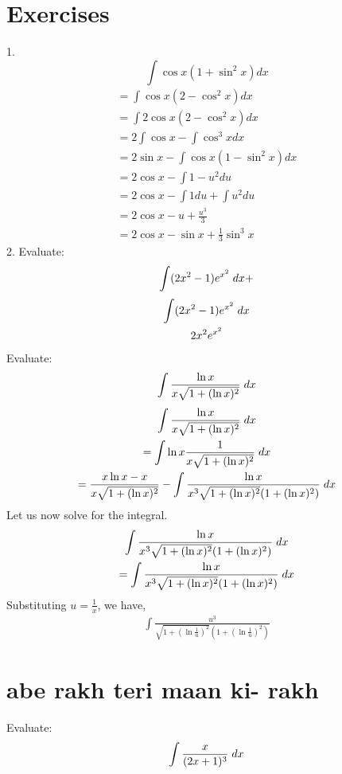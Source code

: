 \documentclass{article}
\begin{document}
\section{Exercises}
1.
$$\int \cos x (1+\sin^2 x) dx$$
\begin{gather*}
    = \int \cos x (2-\cos^2 x) dx
    \\= \int 2\cos x (2-\cos^2 x) dx
    \\= 2 \int \cos x -\int \cos^3 x dx
    \\= 2 \sin x -\int \cos x (1-\sin^2 x) dx
    \\= 2 \cos x -\int 1-u^2 du
    \\= 2\cos x -\int 1 du +\int u^2 du 
    \\= 2\cos x -u + \frac{u^3}{3}
    \\= 2\cos x -\sin x + \frac{1}{3} \sin^3 x
    \end{gather*}
2. Evaluate:
$$\int (2x^2-1)e^{x^{2}}\hspace{1mm}dx+$$
\begin{gather*}
   \int (2x^2-1)e^{x^{2}} \hspace{1mm}dx
\\ 2x^2e^{x^2}
\end{gather*}
Evaluate:
$$\int \frac{\ln{x}}{x\sqrt{1+(\ln{x})^2}} \hspace{1mm} dx$$
\begin{gather*}
    \int \frac{\ln{x}}{x\sqrt{1+(\ln{x})^2}} \hspace{1mm} dx
    \\= \int \ln{x} \frac{1}{x\sqrt{1+(\ln{x})^2}} \hspace{1mm} dx
    \\=\frac{x\ln{x}-x}{x\sqrt{1+(\ln{x})^2}} - \int \frac{\ln{x}}{x^3\sqrt{1+(\ln x)^2}(1+(\ln{x})^2)}\hspace{1mm} dx
\end{gather*}
Let us now solve for the integral.
\begin{gather*}
    \int \frac{\ln{x}}{x^3\sqrt{1+(\ln x)^2}(1+(\ln{x})^2)}\hspace{1mm} dx
    \\= \int \frac{\ln{x}}{x^3\sqrt{1+(\ln x)^2}(1+(\ln{x})^2)}\hspace{1mm} dx
\end{gather*}
Substituting $u=\frac{1}{x}$, we have,
\begin{gather*}
    \int \frac{u^3}{\sqrt{1+(\ln{\frac{1}{u}})^2}(1+(\ln{\frac{1}{u}})^2)}
\end{gather*}
\section{abe rakh teri maan ki- rakh}
Evaluate: $$\int \frac{x}{(2x+1)^3}\hspace{1mm}dx$$
\end{document}
